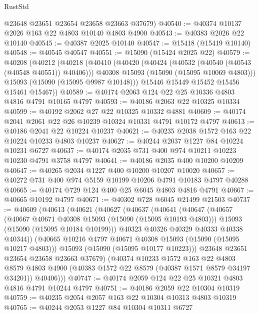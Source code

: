\begin{lexlean}{RustStd}
\begin{coremodule}
      @23648
      @23651
      @23654
      @23658
      @23663
      @37679)
@40540 := @40374 @10137 @2026 @163 @22 @4803 @10140 @4803 @4900
@40543 := @40383 @2026 @22 @10140
@40545 := @40387 @2025 @10140
@40547 := @15418 (@15419 @10140)
@40548 := @40545 @40547
@40551 := @15090 (@15424 @2025 @22)
@40579 := @40208
    (@40212
      (@40218
        (@40410
          (@40420
            (@40424 (@40532 (@40540 (@40543 (@40548 @40551)) @40406)))
            @40308
            @15093
            (@15090 (@15095 @10069 @4803)))
          @15093
          (@15090 (@15095 @9987 @10148)))
        @15446
        @15449
        @15452
        @15456
        @15461
        @15467))
@40589 := @40174 @2063 @124 @22 @25 @10336 @4803 @4816 @4791 @10165 @4797
@40593 := @40186 @2063 @22 @10325 @10334
@40599 := @40192 @2062 @27 @22 @10325 @10332 @4881
@40609 := @40174 @2041 @2061 @22 @26 @10239 @10324 @10331 @4791 @10172 @4797
@40613 := @40186 @2041 @22 @10224 @10237
@40621 := @40235 @2038 @1572 @163 @22 @10224 @10233 @4803 @10237
@40627 := @40244 @2037 @1227 @84 @10224 @10231 @6727
@40637 := @40174 @2035 @731 @400 @974 @10211 @10223 @10230 @4791 @3758 @4797
@40641 := @40186 @2035 @400 @10200 @10209
@40647 := @40265 @2034 @1227 @400 @10200 @10207 @10020
@40657 := @40272 @731 @400 @974 @5159 @10199 @10206 @4791 @10183 @4797 @40288
@40665 := @40174 @729 @124 @400 @25 @6045 @4803 @4816 @4791
@40667 := @40665 @10192 @4797
@40671 := @40302 @728 @6045 @21499 @21503
@40737 := @40609
    (@40613
      (@40621
        (@40627
          (@40637
            (@40641
              (@40647
                (@40657
                  (@40667 @40671 @40308 @15093 (@15090 (@15095 @10193 @4803)))
                  @15093
                  (@15090 (@15095 @10184 @10199)))
                @40323
                @40326
                @40329
                @40333
                @40338
                @40344))
            (@40665 @10216 @4797 @40671 @40308 @15093 (@15090 (@15095 @10217 @4803)))
            @15093
            (@15090 (@15095 @10177 @10223)))
          @23648
          @23651
          @23654
          @23658
          @23663
          @37679)
        (@40374
          @10233
          @1572
          @163
          @22
          @4803
          @8579
          @4803
          @4900
          (@40383 @1572 @22 @8579 (@40387 @1571 @8579 @34197 @34201))
          @40406)))
@40747 := @40174 @2059 @124 @22 @25 @10321 @4803 @4816 @4791 @10244 @4797
@40751 := @40186 @2059 @22 @10304 @10319
@40759 := @40235 @2054 @2057 @163 @22 @10304 @10313 @4803 @10319
@40765 := @40244 @2053 @1227 @84 @10304 @10311 @6727

\end{coremodule}
\end{lexlean}
